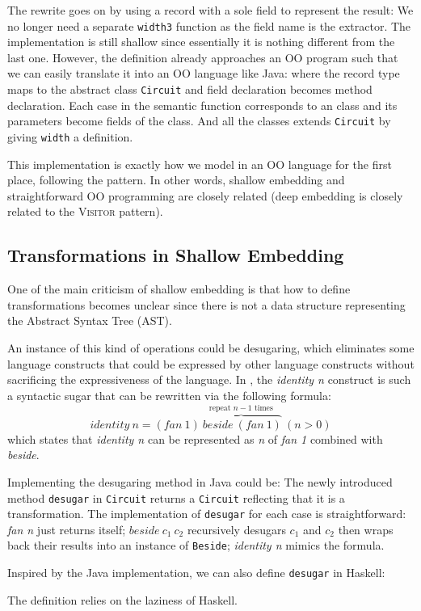 The rewrite goes on by using a record with a sole field to represent the result:
We no longer need a separate \texttt{width3} function as the field name is the extractor.
The implementation is still shallow since essentially it is nothing different
from the last one.
However, the definition already approaches an OO program such that we can easily
translate it into an OO language like Java:
where the record type maps to the abstract class \texttt{Circuit} and field
declaration becomes method declaration.
Each case in the semantic function corresponds to an class and its parameters become fields of the class.
And all the classes extends \texttt{Circuit} by giving \texttt{width} a definition.

This implementation is exactly how we model \dsl in an OO language for the first
place, following the \interp pattern.
In other words, shallow embedding and straightforward OO programming are closely
related (deep embedding is closely related to the \textsc{Visitor} pattern).

\subsection{Transformations in Shallow Embedding}
One of the main criticism of shallow embedding is that how to define transformations
becomes unclear since there is not a data structure representing the Abstract Syntax Tree (AST).

An instance of this kind of operations could be desugaring, which eliminates some
language constructs that could be expressed by other language constructs without
sacrificing the expressiveness of the language.
In \dsl, the \emph{identity n} construct is such a syntactic sugar that can
be rewritten via the following formula:
$$identity\ n = (fan\ 1) \overbrace{\ beside\ (fan\ 1)}^{\text{repeat }n-1\text{ times}}\ (n > 0)$$
which states that \emph{identity n} can be represented as \emph{n} of \emph{fan 1} combined with \emph{beside}.

Implementing the desugaring method in Java could be:
The newly introduced method \texttt{desugar} in \texttt{Circuit} returns a \texttt{Circuit} reflecting that it is a transformation. The implementation of \texttt{desugar} for each case is
straightforward: \emph{fan n} just returns itself; $beside\ c_1\ c_2$ recursively desugars $c_1$ and $c_2$ then wraps back
their results into an instance of \texttt{Beside}; \emph{identity n} mimics the
formula.

Inspired by the Java implementation, we can also define \texttt{desugar} in Haskell:

The definition relies on the laziness of Haskell.
